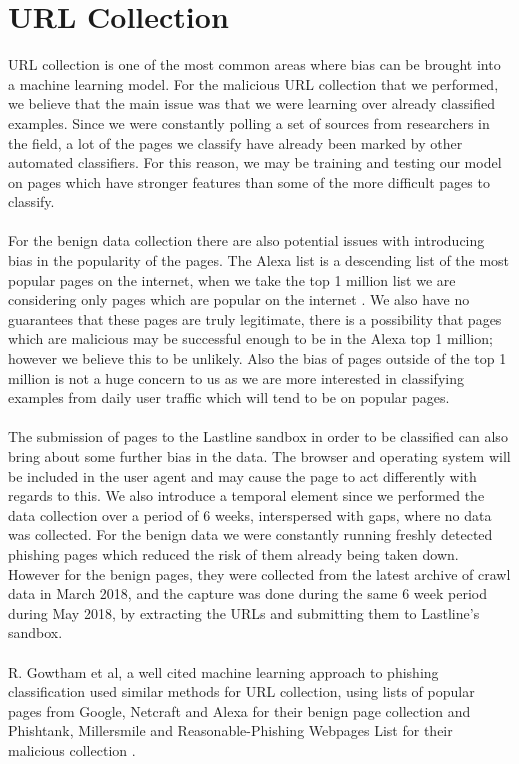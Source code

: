\documentclass[12pt,twoside]{report}
\begin{document}
\section{URL Collection}
URL collection is one of the most common areas where bias can be brought into a machine learning model. For the malicious URL collection that we performed, we believe that the main issue was that we were learning over already classified examples. Since we were constantly polling a set of sources from researchers in the field, a lot of the pages we classify have already been marked by other automated classifiers. For this reason, we may be training and testing our model on pages which have stronger features than some of the more difficult pages to classify.
\\\\
For the benign data collection there are also potential issues with introducing bias in the popularity of the pages. The Alexa list is a descending list of the most popular pages on the internet, when we take the top 1 million list we are considering only pages which are popular on the internet \cite{alexa}. We also have no guarantees that these pages are truly legitimate, there is a possibility that pages which are malicious may be successful enough to be in the Alexa top 1 million; however we believe this to be unlikely. Also the bias of pages outside of the top 1 million is not a huge concern to us as we are more interested in classifying examples from daily user traffic which will tend to be on popular pages.
\\\\
The submission of pages to the Lastline sandbox in order to be classified can also bring about some further bias in the data. The browser and operating system will be included in the user agent and may cause the page to act differently with regards to this. We also introduce a temporal element since we performed the data collection over a period of 6 weeks, interspersed with gaps, where no data was collected. For the benign data we were constantly running freshly detected phishing pages which reduced the risk of them already being taken down. However for the benign pages, they were collected from the latest archive of crawl data in March 2018, and the capture was done during the same 6 week period during May 2018, by extracting the URLs and submitting them to Lastline's sandbox.
\\\\
R. Gowtham et al, a well cited machine learning approach to phishing classification used similar methods for URL collection, using lists of popular pages from Google, Netcraft and Alexa for their benign page collection and Phishtank, Millersmile and Reasonable-Phishing Webpages List for their malicious collection \cite{effaciousarchitecture}.
\end{document}
